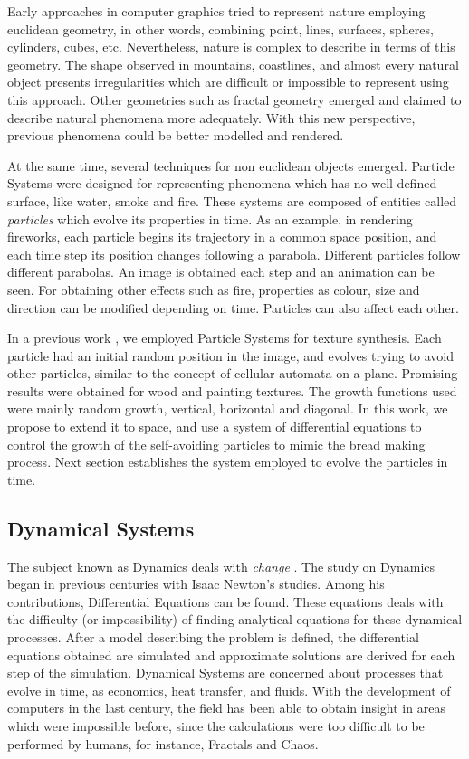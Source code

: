 \documentclass[oneside,a4paper,english,links]{amca}
\begin{document}
Early approaches in computer graphics tried to represent nature employing euclidean geometry, in other words, combining point, lines, surfaces, spheres, cylinders, cubes, etc. Nevertheless, nature is complex to describe in terms of this geometry. The shape observed in mountains, coastlines,  and almost every natural object presents irregularities which are difficult or impossible to represent using this approach. Other geometries such as fractal geometry \citep{Mandelbrot83} emerged and claimed to describe natural phenomena more adequately. With this new perspective, previous phenomena could be better modelled and rendered. 

At the same time, several techniques for non euclidean objects emerged. Particle Systems \citep{Reeves83} were designed for representing phenomena which has no well defined surface, like water, smoke and fire. These systems are composed of entities called {\em particles} which evolve its properties in time. As an example, in rendering fireworks, each particle begins its trajectory in a common space position, and each time step its position changes following a parabola. Different particles follow different parabolas. An image is obtained each step and an animation can be seen. For obtaining other effects such as fire, properties as colour, size and direction can be modified depending on time. Particles can also affect each other.

In a previous work \citep{Baravalle2011}, we employed Particle Systems for texture synthesis. Each particle had an initial random position in the image, and evolves trying to avoid other particles, similar to the concept of cellular automata on a plane. Promising results were obtained for wood and painting textures. The growth functions used were mainly random growth, vertical, horizontal and diagonal. In this work, we propose to extend it to space, and use a system of differential equations to control the growth of the self-avoiding particles to mimic the bread making process. Next section establishes the system employed to evolve the particles in time.

\subsection{Dynamical Systems}

The subject known as Dynamics deals with {\em change} \citep{Strogatz2001}. The study on Dynamics began in previous centuries with Isaac Newton's studies. Among his contributions, Differential Equations can be found. These equations deals with the difficulty (or impossibility) of finding analytical equations for these dynamical processes. After a model describing the problem is defined, the differential equations obtained are simulated and approximate solutions are derived for each step of the simulation. Dynamical Systems are concerned about processes that evolve in time, as economics, heat transfer, and fluids. With the development of computers in the last century, the field has been able to obtain insight in areas which were impossible before, since the calculations were too difficult to be performed by humans, for instance, Fractals \citep{Mandelbrot83} and Chaos.
\end{document}
